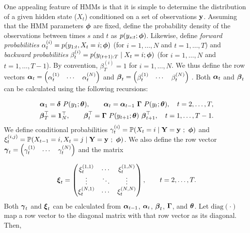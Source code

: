 One appealing feature of HMMs is that it is simple to determine the distribution of a given hidden state ($X_t$) conditioned on a set of observations $\mathbf{y}$. Assuming that the HMM parameters $\boldsymbol{\phi}$ are fixed, define the probability density of the observations between times $s$ and $t$ as $p(y_{s:t};\boldsymbol{\phi})$. Likewise, define \textit{forward probabilities} $\alpha^{(i)}_t = p(y_{1:t},X_t = i;\boldsymbol{\phi})$ (for $i = 1,\ldots,N$ and $t = 1,\ldots,T$) and \textit{backward probabilities} $\beta^{(i)}_t = p(y_{(t+1):T} \mid X_t = i;\boldsymbol{\phi})$ (for $i = 1,\ldots,N$ and $t = 1,\ldots,T-1$). By convention, $\beta^{(i)}_T = 1$ for $i = 1,\ldots,N$. We thus define the row vectors $\boldsymbol{\alpha}_t = \begin{pmatrix} \alpha_t^{(1)} & \cdots & \alpha_t^{(N)} \end{pmatrix}$ and $\boldsymbol{\beta}_t = \begin{pmatrix} \beta_t^{(1)} & \cdots & \beta_t^{(N)} \end{pmatrix}$ . Both $\boldsymbol{\alpha}_t$ and $\boldsymbol{\beta}_t$ can be calculated using the following recursions:

\begin{gather}
    \boldsymbol{\alpha}_1 = \boldsymbol{\delta} ~ P(y_1;\boldsymbol{\theta}), \qquad 
    \boldsymbol{\alpha}_t = \boldsymbol{\alpha}_{t-1} ~ \boldsymbol{\Gamma} ~ P(y_t;\boldsymbol{\theta}), \quad t = 2,\ldots,T, \label{eqn:alpha} \\
    \boldsymbol{\beta}^\top_T = \mathbf{1}_N^\top, \qquad
    \boldsymbol{\beta}^\top_t = \boldsymbol{\Gamma} ~ P(y_{t+1};\boldsymbol{\theta}) ~ \boldsymbol{\beta}^\top_{t+1}, \quad t = 1,\ldots,T-1. \label{eqn:beta}
\end{gather}
%
We define conditional probabilities $\gamma_t^{(i)} = \mathbb{P}(X_t = i \mid \mathbf{Y} = \mathbf{y} ~;~ \boldsymbol{\phi})$ and $\xi_t^{(i,j)} = \mathbb{P}(X_{t-1} = i, X_t = j \mid \mathbf{Y} = \mathbf{y} ~;~ \boldsymbol{\phi})$. We also define the row vector $\boldsymbol{\gamma}_t = \begin{pmatrix} \gamma_t^{(1)} & \cdots & \gamma_t^{(N)} \end{pmatrix}$ and the matrix 

\begin{equation*}
    \boldsymbol{\xi}_t = \begin{pmatrix} 
    \xi_t^{(1,1)} & \cdots & \xi_t^{(1,N)} \\
    \vdots & \ddots & \vdots \\
    \xi_t^{(N,1)} & \cdots & \xi_t^{(N,N)} \\
    \end{pmatrix}, \qquad t = 2,\ldots,T. 
\end{equation*}
%
Both $\boldsymbol{\gamma}_t$ and $\boldsymbol{\xi}_t$ can be calculated from $\boldsymbol{\alpha}_{t-1}$, $\boldsymbol{\alpha}_t$, $\boldsymbol{\beta}_t$, $\boldsymbol{\Gamma}$, and $\boldsymbol{\theta}$. Let $\text{diag}(\cdot)$ map a row vector to the diagonal matrix with that row vector as its diagonal. Then,

